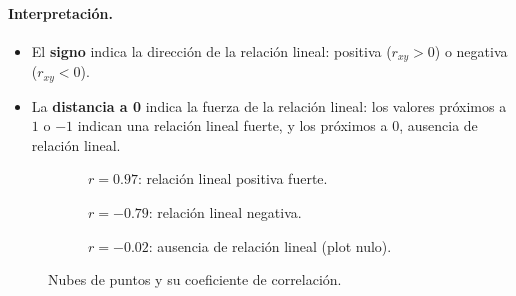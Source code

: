 \paragraph{Interpretación.}
\begin{itemize}
  \item El \textbf{signo} indica la dirección de la relación lineal: positiva ($r_{xy}>0$) o
    negativa ($r_{xy}<0$).
  \item La \textbf{distancia a 0} indica la fuerza de la relación lineal: los valores próximos
    a $1$ o $-1$ indican una relación lineal fuerte, y los próximos a $0$, ausencia de relación
    lineal.
\end{itemize}

\begin{figure}[H]
  \centering
  \begin{subfigure}[t]{0.32\linewidth}
    \centering
    \caption{$r=0.97$: relación lineal positiva fuerte.}
  \end{subfigure}\hfill
  \begin{subfigure}[t]{0.32\linewidth}
    \centering
    \caption{$r=-0.79$: relación lineal negativa.}
  \end{subfigure}\hfill
  \begin{subfigure}[t]{0.32\linewidth}
    \centering
    \caption{$r=-0.02$: ausencia de relación lineal (plot nulo).}
  \end{subfigure}
  \caption{Nubes de puntos y su coeficiente de correlación.}
\end{figure}

